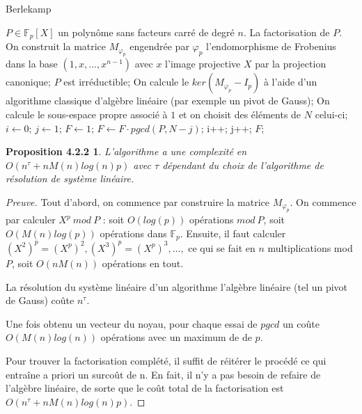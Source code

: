 \begin{algorithm}[H]
\caption{Berlekamp}
\begin{algorithmic} 
\REQUIRE $P\in\mathbb{F}_{p}[X]$ un polynôme sans facteurs carré de degré $n$.
\ENSURE La factorisation de $P$.
\STATE On construit la matrice $M_{\varphi_{p}}$ engendrée par $\varphi_{p}$ l'endomorphisme de Frobenius dans la base $(1, x, \ldots, x^{n-1})$ avec $x$ l'image projective $X$ par la projection canonique;
	\RETURN $P$ est irréductible;
\ELSE 
	\STATE On calcule le $ker(M_{\varphi_{p}}-I_{p})$ à l'aide d'un algorithme classique d'algèbre linéaire (par exemple un pivot de Gauss);
	\STATE On calcule le sous-espace propre associé à $1$ et on choisit des éléments de $N$ celui-ci;
	\STATE $i\gets 0$;
	\STATE $j\gets 1$;
	\STATE $F\gets 1$;
			\STATE $F\gets F\cdot pgcd(P,N-j)$;
			\STATE i++;
		\ENDIF
		\STATE j++;
	\ENDWHILE
\ENDIF 
\RETURN $F$;
\end{algorithmic}
\end{algorithm}

\newtheorem*{prop12}{Proposition 4.2.2}
\begin{prop12}
	L’algorithme a une complexité en $O(n^{\tau}+nM(n)log(n)p)$ avec $\tau$ dépendant du choix de l'algorithme de résolution de système linéaire.
\end{prop12}

\begin{proof}[Preuve]
	Tout d'abord, on commence par construire la matrice $M_{\varphi_{p}}$. 
	On commence par calculer $X^{p}\ mod\ P$ : soit $O(log(p))$ opérations $mod\ P$, soit $O(M(n) log(p))$ opérations dans $\mathbb{F}_{p}$.
	Ensuite, il faut calculer $(X^{2})^{p}=(X^{p})^{2}, (X^{3})^{p}=(X^{p})^{3}, \ldots,$ ce qui se fait en $n$ multiplications mod $P$, soit $O(nM(n))$ opérations en tout.

	La résolution du système linéaire d'un algorithme l'algèbre linéaire (tel un pivot de Gauss) coûte $n^{\tau}$.

	Une fois obtenu un vecteur du noyau, pour chaque essai de $pgcd$ un coûte $O(M(n)log(n))$ opérations avec un maximum de de $p$.

	Pour trouver la factorisation complété, il suffit de réitérer le procédé ce qui entraîne a priori un surcoût de n.
	En fait, il n’y a pas besoin de refaire de l’algèbre linéaire, de sorte que le coût total de la factorisation est $O(n^{\tau} + nM(n) log(n) p)$.
\end{proof}

